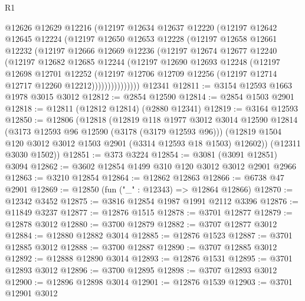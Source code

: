 \begin{lexlean}{R1}
\begin{coremodule}
            @12626
            @12629
            @12216
            (@12197
              @12634
              @12637
              @12220
              (@12197
                @12642
                @12645
                @12224
                (@12197
                  @12650
                  @12653
                  @12228
                  (@12197
                    @12658
                    @12661
                    @12232
                    (@12197
                      @12666
                      @12669
                      @12236
                      (@12197
                        @12674
                        @12677
                        @12240
                        (@12197
                          @12682
                          @12685
                          @12244
                          (@12197
                            @12690
                            @12693
                            @12248
                            (@12197
                              @12698
                              @12701
                              @12252
                              (@12197
                                @12706
                                @12709
                                @12256
                                (@12197 @12714 @12717 @12260 @12212)))))))))))))))
    @12341
@12811 := @3154 @12593 @1663 @1978 @3015 @3012
@12812 := @2854 @12590
@12814 := @2854 @1503 @2901
@12818 := @12811 (@12812 @12814) (@2880 @12341)
@12819 := @3164 @12593
@12850 := @12806
    (@12818
      (@12819
        @118
        @1977
        @3012
        @3014
        @12590
        @12814
        (@3173 @12593 @96 @12590 (@3178 (@3179 @12593 @96)))
        (@12819 @1504 @120 @3012 @3012 @1503 @2901 (@3314 @12593 @18 @1503) @12602))
      (@12311 @3030 @1502))
@12851 := @373 @3224
@12854 := @3081 (@3091 @12851) @3094
@12862 := @3602 @12854 @1499 @310 @120 @3012 @3012 @2901 @2966
@12863 := @3210 @12854
@12864 := @12862 @12863
@12866 := @6738 @47 @2901
@12869 := @12850 (fun ("_" : @12343) => @12864 @12866)
@12870 := @12342 @3452
@12875 := @3816 @12854 @1987 @1991 @2112 @3396
@12876 := @11849 @3237
@12877 := @12876 @1515
@12878 := @3701 @12877
@12879 := @12878 @3012
@12880 := @3700 @12879
@12882 := @3707 @12877 @3012
@12884 := @12880 @12882 @3014
@12885 := @12876 @1523
@12887 := @3701 @12885 @3012
@12888 := @3700 @12887
@12890 := @3707 @12885 @3012
@12892 := @12888 @12890 @3014
@12893 := @12876 @1531
@12895 := @3701 @12893 @3012
@12896 := @3700 @12895
@12898 := @3707 @12893 @3012
@12900 := @12896 @12898 @3014
@12901 := @12876 @1539
@12903 := @3701 @12901 @3012

\end{coremodule}
\end{lexlean}

